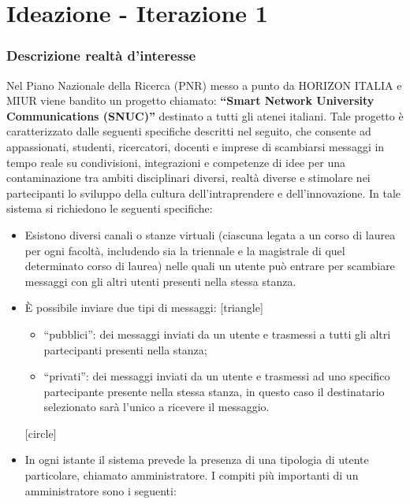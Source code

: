 \documentclass[t]{beamer} %
\newcommand{\virgolette}[1]{``#1''}
\let\olditem=\item%
\renewcommand{\item}{\olditem \justifying}%
\begin{document}
\section{Ideazione - Iterazione 1}
 \begin{frame}[allowframebreaks] 
  \frametitle {Descrizione realtà d'interesse} 
   Nel Piano Nazionale della Ricerca (PNR)  messo a punto da HORIZON ITALIA e MIUR viene bandito un progetto chiamato:\newline
   \textbf{\virgolette{Smart Network University Communications (SNUC)}} destinato a tutti gli atenei italiani.\newline 
   Tale progetto è caratterizzato dalle seguenti specifiche descritti nel seguito, che consente ad appassionati, studenti,    
   ricercatori, docenti e imprese di scambiarsi messaggi in tempo reale su condivisioni, integrazioni e competenze di idee per una contaminazione tra ambiti 
   disciplinari diversi, realtà diverse e stimolare nei partecipanti lo sviluppo della  cultura dell’intraprendere e dell’innovazione.\newline 
   In tale sistema si richiedono le seguenti specifiche:
   \begin{itemize} 
    \item Esistono diversi canali o stanze virtuali (ciascuna legata a un corso di laurea per ogni facoltà, includendo sia la triennale e la magistrale di quel 
          determinato corso di laurea) nelle quali un utente può entrare per scambiare messaggi con gli altri utenti presenti nella stessa stanza.
    \item \`E possibile inviare due tipi di messaggi: 
          [triangle]
          \begin{itemize} 
            \item \virgolette{pubblici}: dei messaggi inviati da un utente e trasmessi a tutti gli altri partecipanti presenti nella stanza; 
            \item \virgolette{privati}: dei messaggi inviati da un utente e trasmessi ad uno specifico partecipante presente nella stessa stanza, in questo caso il 
                                        destinatario selezionato sarà l’unico a ricevere il messaggio.
          \end{itemize}
          [circle]
    \item In ogni istante il sistema prevede la presenza di una tipologia di utente particolare, chiamato amministratore. I compiti più importanti di un 
          amministratore sono i seguenti: 

\end{itemize}
\end{frame}
\end{document}
